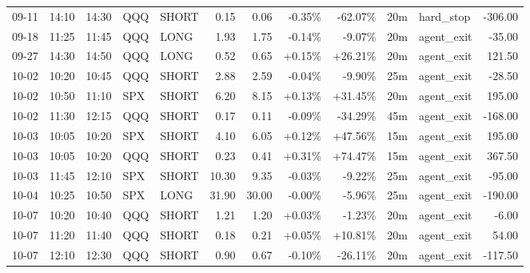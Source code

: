 \documentclass[11pt,a4paper]{article}
\begin{document}
\begin{center}
\begin{longtable}{>{\color{txtmain}}l l l l l r r r r r >{\color{txtmain}}l r}
09-11 & 14:10 & 14:30 & QQQ & SHORT & 0.15 & 0.06 & \textcolor{lossred}{-0.35\%} & \textcolor{lossred}{-62.07\%} & 20m & hard\_stop & \textcolor{lossred}{-306.00} \\
09-18 & 11:25 & 11:45 & QQQ & LONG & 1.93 & 1.75 & \textcolor{lossred}{-0.14\%} & \textcolor{lossred}{-9.07\%} & 20m & agent\_exit & \textcolor{lossred}{-35.00} \\
09-27 & 14:30 & 14:50 & QQQ & LONG & 0.52 & 0.65 & \textcolor{wingreen}{+0.15\%} & \textcolor{wingreen}{+26.21\%} & 20m & agent\_exit & \textcolor{wingreen}{121.50} \\
10-02 & 10:20 & 10:45 & QQQ & SHORT & 2.88 & 2.59 & \textcolor{lossred}{-0.04\%} & \textcolor{lossred}{-9.90\%} & 25m & agent\_exit & \textcolor{lossred}{-28.50} \\
10-02 & 10:50 & 11:10 & SPX & SHORT & 6.20 & 8.15 & \textcolor{wingreen}{+0.13\%} & \textcolor{wingreen}{+31.45\%} & 20m & agent\_exit & \textcolor{wingreen}{195.00} \\
10-02 & 11:30 & 12:15 & QQQ & SHORT & 0.17 & 0.11 & \textcolor{lossred}{-0.09\%} & \textcolor{lossred}{-34.29\%} & 45m & agent\_exit & \textcolor{lossred}{-168.00} \\
10-03 & 10:05 & 10:20 & SPX & SHORT & 4.10 & 6.05 & \textcolor{wingreen}{+0.12\%} & \textcolor{wingreen}{+47.56\%} & 15m & agent\_exit & \textcolor{wingreen}{195.00} \\
10-03 & 10:05 & 10:20 & QQQ & SHORT & 0.23 & 0.41 & \textcolor{wingreen}{+0.31\%} & \textcolor{wingreen}{+74.47\%} & 15m & agent\_exit & \textcolor{wingreen}{367.50} \\
10-03 & 11:45 & 12:10 & SPX & SHORT & 10.30 & 9.35 & \textcolor{lossred}{-0.03\%} & \textcolor{lossred}{-9.22\%} & 25m & agent\_exit & \textcolor{lossred}{-95.00} \\
10-04 & 10:25 & 10:50 & SPX & LONG & 31.90 & 30.00 & \textcolor{lossred}{-0.00\%} & \textcolor{lossred}{-5.96\%} & 25m & agent\_exit & \textcolor{lossred}{-190.00} \\
10-07 & 10:20 & 10:40 & QQQ & SHORT & 1.21 & 1.20 & \textcolor{wingreen}{+0.03\%} & \textcolor{lossred}{-1.23\%} & 20m & agent\_exit & \textcolor{lossred}{-6.00} \\
10-07 & 11:20 & 11:40 & QQQ & SHORT & 0.18 & 0.21 & \textcolor{wingreen}{+0.05\%} & \textcolor{wingreen}{+10.81\%} & 20m & agent\_exit & \textcolor{wingreen}{54.00} \\
10-07 & 12:10 & 12:30 & QQQ & SHORT & 0.90 & 0.67 & \textcolor{lossred}{-0.10\%} & \textcolor{lossred}{-26.11\%} & 20m & agent\_exit & \textcolor{lossred}{-117.50} \\

\end{longtable}
\end{center}
\end{document}
